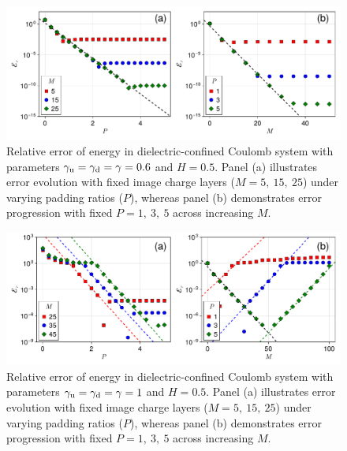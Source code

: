 \begin{figure}[htbp]
    \centering
    \includegraphics[width=0.98\linewidth]{figs/error_icm_pad_gamma_0.6.pdf}
    \caption{Relative error of energy in dielectric-confined Coulomb system with parameters $\gamma_{\text{u}} = \gamma_{\text{d}} = \gamma = 0.6$ and $H = 0.5$. Panel (a) illustrates error evolution with fixed image charge layers ($M = 5,~15,~25$) under varying padding ratios ($P$), whereas panel (b) demonstrates error progression with fixed $P = 1,~3,~5$ across increasing $M$.}
    \label{fig:error_icm_pad_gamma_0.6}
\end{figure}

\begin{figure}[htbp]
    \centering
    \includegraphics[width=0.98\linewidth]{figs/error_icm_pad_gamma_1.pdf}
    \caption{Relative error of energy in dielectric-confined Coulomb system with parameters $\gamma_{\text{u}} = \gamma_{\text{d}} = \gamma = 1$ and $H = 0.5$. Panel (a) illustrates error evolution with fixed image charge layers ($M = 5,~15,~25$) under varying padding ratios ($P$), whereas panel (b) demonstrates error progression with fixed $P = 1,~3,~5$ across increasing $M$.}
    \label{fig:error_icm_pad_gamma_1}
\end{figure}


